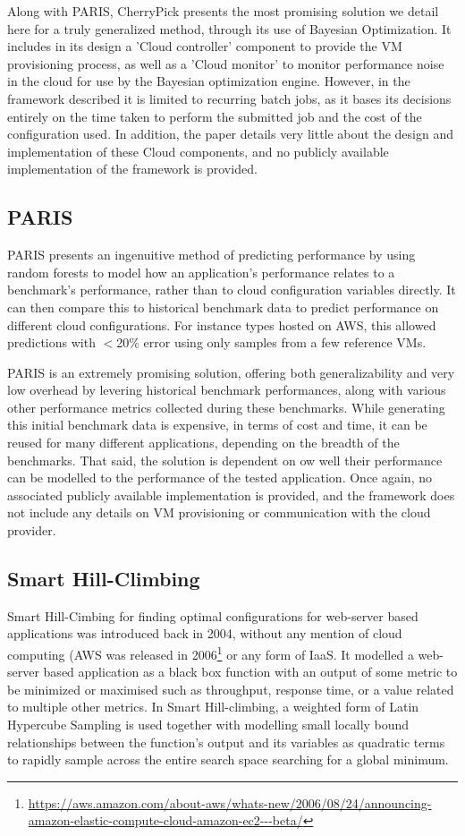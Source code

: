 \documentclass{report}
\begin{document}
Along with PARIS, CherryPick presents the most promising solution we detail here for a truly generalized method, through its use of Bayesian Optimization. It includes in its design a 'Cloud controller' component to provide the VM provisioning process, as well as a 'Cloud monitor' to monitor performance noise in the cloud for use by the Bayesian optimization engine. However, in the framework described it is limited to recurring batch jobs, as it bases its decisions entirely on the time taken to perform the submitted job and the cost of the configuration used. In addition, the paper details very little about the design and implementation of these Cloud components, and no publicly available implementation of the framework is provided.

\subsection{PARIS}
PARIS \cite{Yadwadkar2017} presents an ingenuitive method of predicting performance by using random forests to model how an application's performance relates to a benchmark's performance, rather than to cloud configuration variables directly. It can then compare this to historical benchmark data to predict performance on different cloud configurations. For instance types hosted on AWS, this allowed predictions with $<$20\% error using only samples from a few reference VMs.

PARIS is an extremely promising solution, offering both generalizability and very low overhead by levering historical benchmark performances, along with various other performance metrics collected during these benchmarks. While generating this initial benchmark data is expensive, in terms of cost and time, it can be reused for many different applications, depending on the breadth of the benchmarks. That said, the solution is dependent on ow well their performance can be modelled to the performance of the tested application. Once again, no associated publicly available implementation is provided, and the framework does not include any details on VM provisioning or communication with the cloud provider.

\subsection{Smart Hill-Climbing}
Smart Hill-Cimbing for finding optimal configurations for web-server based applications was introduced back in 2004\cite{Xi2004}, without any mention of cloud computing (AWS was released in 2006\footnote{\url{https://aws.amazon.com/about-aws/whats-new/2006/08/24/announcing-amazon-elastic-compute-cloud-amazon-ec2---beta/}} or any form of IaaS. It modelled a web-server based application as a black box function with an output of some metric to be minimized or maximised such as throughput, response time, or a value related to multiple other metrics. In Smart Hill-climbing, a weighted form of Latin Hypercube Sampling\cite{McKay2000} is used together with modelling small locally bound relationships between the function's output and its variables as quadratic terms to rapidly sample across the entire search space searching for a global minimum.
\end{document}
